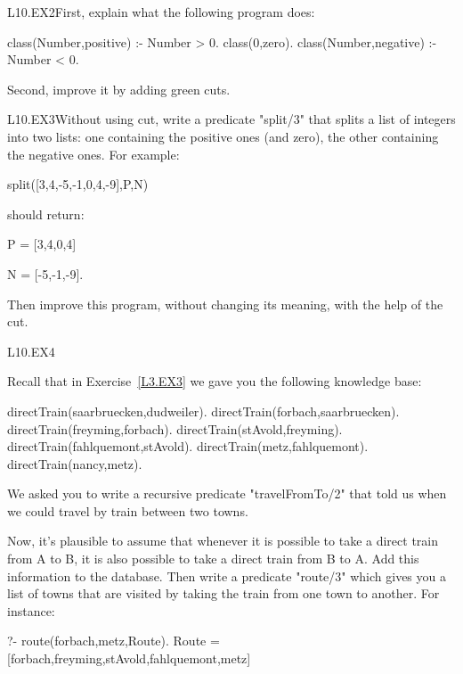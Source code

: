 \begin{LPNexercise}{L10.EX2}First, explain what the following program does:
\begin{LPNcodedisplay}
class(Number,positive) :- Number > 0.
class(0,zero).
class(Number,negative) :- Number < 0.
\end{LPNcodedisplay}

Second, improve it by adding green cuts.
\end{LPNexercise}


\begin{LPNexercise}{L10.EX3}Without using cut, write a predicate "split/3"
that splits a list of integers into two lists: one containing the
positive ones (and zero), the other containing the negative ones.  For
example:
\begin{LPNcodedisplay}
    split([3,4,-5,-1,0,4,-9],P,N)
\end{LPNcodedisplay}
should return:
\begin{LPNcodedisplay}
    P = [3,4,0,4]

    N = [-5,-1,-9].
\end{LPNcodedisplay}
Then improve this program, without changing its meaning, with the help
of the cut.
\end{LPNexercise}

\begin{LPNexercise}{L10.EX4}

Recall that in Exercise~\ref{L3.EX3} we gave you the following
knowledge base:
\begin{LPNcodedisplay}
directTrain(saarbruecken,dudweiler).
directTrain(forbach,saarbruecken).
directTrain(freyming,forbach).
directTrain(stAvold,freyming).
directTrain(fahlquemont,stAvold).
directTrain(metz,fahlquemont).
directTrain(nancy,metz).
\end{LPNcodedisplay}
We asked you to write a recursive predicate "travelFromTo/2" that
told us when we could travel by train between two towns.

Now, it's plausible to assume that whenever it is possible
to take a direct train from A to B, it is also possible to take a
direct train from B to A. Add this information to the database.
Then write a predicate  "route/3" which gives you a list of towns
that are visited by taking the train from one town to another.
For instance:

\begin{LPNcodedisplay}
?- route(forbach,metz,Route).
Route = [forbach,freyming,stAvold,fahlquemont,metz]
\end{LPNcodedisplay}

\end{LPNexercise}


